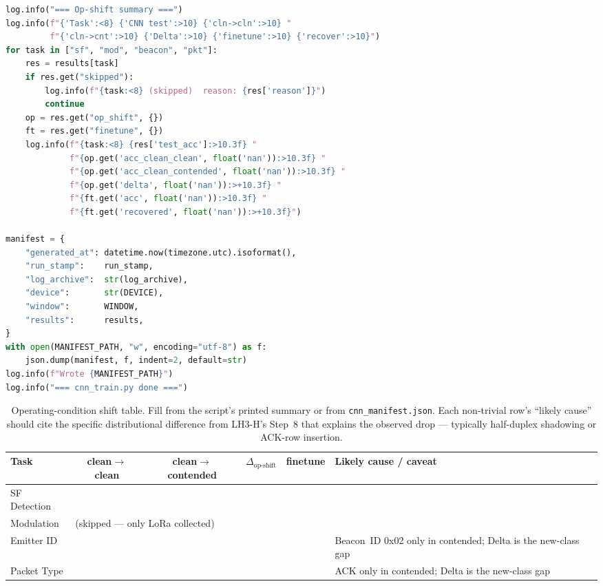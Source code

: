 \documentclass[11pt,letterpaper]{article}
\begin{document}
\begin{lstlisting}[language=Python]
log.info("=== Op-shift summary ===")
log.info(f"{'Task':<8} {'CNN test':>10} {'cln->cln':>10} "
         f"{'cln->cnt':>10} {'Delta':>10} {'finetune':>10} {'recover':>10}")
for task in ["sf", "mod", "beacon", "pkt"]:
    res = results[task]
    if res.get("skipped"):
        log.info(f"{task:<8} (skipped)  reason: {res['reason']}")
        continue
    op = res.get("op_shift", {})
    ft = res.get("finetune", {})
    log.info(f"{task:<8} {res['test_acc']:>10.3f} "
             f"{op.get('acc_clean_clean', float('nan')):>10.3f} "
             f"{op.get('acc_clean_contended', float('nan')):>10.3f} "
             f"{op.get('delta', float('nan')):>+10.3f} "
             f"{ft.get('acc', float('nan')):>10.3f} "
             f"{ft.get('recovered', float('nan')):>+10.3f}")

manifest = {
    "generated_at": datetime.now(timezone.utc).isoformat(),
    "run_stamp":    run_stamp,
    "log_archive":  str(log_archive),
    "device":       str(DEVICE),
    "window":       WINDOW,
    "results":      results,
}
with open(MANIFEST_PATH, "w", encoding="utf-8") as f:
    json.dump(manifest, f, indent=2, default=str)
log.info(f"Wrote {MANIFEST_PATH}")
log.info("=== cnn_train.py done ===")
\end{lstlisting}

\begin{table}[h!]
	\centering
	\renewcommand{\arraystretch}{1.4}
	\begin{tabularx}{\textwidth}{l c c c c X}
		\toprule
		\textbf{Task} & \textbf{clean$\to$clean} & \textbf{clean$\to$contended} & \textbf{$\Delta_{\text{op-shift}}$} & \textbf{finetune} & \textbf{Likely cause / caveat} \\
		\midrule
		SF Detection     & & & & & \\
		Modulation       & \multicolumn{5}{l}{(skipped --- only LoRa collected)} \\
		Emitter ID       & & & & & Beacon~ID 0x02 only in contended; Delta is the new-class gap \\
		Packet Type      & & & & & ACK only in contended; Delta is the new-class gap \\
		\bottomrule
	\end{tabularx}
	\caption{Operating-condition shift table. Fill from the script's printed summary or from \texttt{cnn\_manifest.json}. Each non-trivial row's ``likely cause'' should cite the specific distributional difference from LH3-H's Step~8 that explains the observed drop --- typically half-duplex shadowing or \mbox{ACK}-row insertion.}
\end{table}
\end{document}
